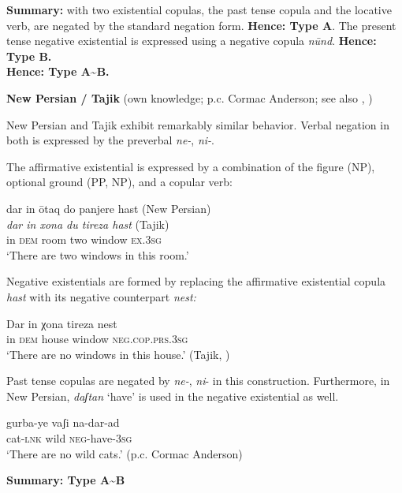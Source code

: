 \documentclass[output=paper]{langsci/langscibook}
\begin{document}
\begin{unindented}
\textbf{Summary:} with two existential copulas, the past tense copula and
the locative verb, are negated by the standard negation form.
\textbf{Hence: Type A}. The present tense negative existential is expressed
using a negative copula \textit{nūnd}. \textbf{Hence: Type B.}\\
\textbf{Hence: Type A{\textasciitilde}B.}

\textbf{New Persian / Tajik} (own knowledge; p.c. Cormac Anderson; see also
\citealt{Perry2005}, \citealt{WindfuhrPerry2009})

New Persian and Tajik exhibit remarkably similar behavior. Verbal negation in both is expressed by the preverbal \textit{ne-}, \textit{ni-}. 

The affirmative existential is expressed by a combination of the figure (NP), optional ground (PP, NP), and a copular verb:
%
\begin{exe}\ex
    \glll dar in ōtaq   do   panjere  hast    (New Persian) \\
\textit{dar in       xona  du   tireza     hast}    (Tajik) \\
in    \textsc{dem}  room  two window \textsc{ex.3sg}\\
    \glt `There are two windows in this room.' \parencite[450]{WindfuhrPerry2009}
    \end{exe}

Negative existentials are formed by replacing the affirmative existential copula \textit{hast} with its negative counterpart \textit{nest:} 
%
\begin{exe}\ex
    \gll Dar  in       χona    tireza     nest \\
in     \textsc{dem}   house   window \textsc{neg.cop.prs.3sg} \\
    \glt `There are no windows in this house.' (Tajik, \citealt[202]{Perry2005})
    \end{exe}

Past tense copulas are negated by \textit{ne-}, \textit{ni}- in this construction. Furthermore, in New Persian, \textit{daʃtan} `have' is used in the negative existential as well.
%
\begin{exe}\ex
    \gll gurba-ye vaʃi  na-dar-ad \\
cat-\textsc{lnk}   wild \textsc{neg}-have-\textsc{3sg} \\
    \glt `There are no wild cats.' (p.c. Cormac Anderson)
    \end{exe}

\textbf{Summary: Type A{\textasciitilde}B}


\end{unindented}
\end{document}
